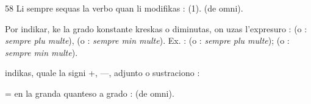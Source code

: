 \begin{VUpage}[62]{58}
Li sempre sequas la verbo quan li modifikas : \nl
{} (1). \nl
{} (de omni).

Por indikar, ke la grado konstante kreskas o diminutas,\nl
on uzas l'expresuro :  (o : \textit{sempre plu multe}),\nl
{} (o : \textit{sempre min multe}). Ex. : \nl
{} (o : \textit{sempre plu multe}); \nl
(o : \textit{sempre min multe}).

 indikas, quale la signi +, ---, adjunto o\nl
sustraciono : \nl
{}

 = en la  granda quanteso\nl
a grado :  (de omni).\parplein
\end{VUpage}

